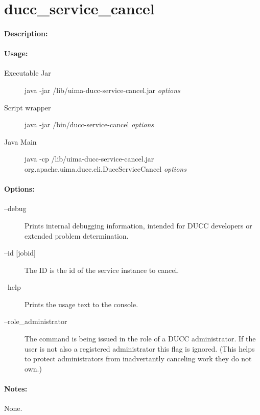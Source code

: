 \ifpdf
\else
{}
\fi
    \section{ducc\_service\_cancel}

    \paragraph{Description:}

    \paragraph{Usage:}
    \begin{description}
    \item[Executable Jar] java -jar \ducchome/lib/uima-ducc-service-cancel.jar {\em options}
    \item[Script wrapper] java -jar \ducchome/bin/ducc-service-cancel {\em options}
    \item[Java Main]      java -cp \ducchome/lib/uima-ducc-service-cancel.jar org.apache.uima.ducc.cli.DuccServiceCancel {\em options}
    \end{description}

    \paragraph{Options:}
    \begin{description}
        \item[--debug ]          
          Prints internal debugging information, intended for DUCC developers or extended problem determination.          
        \item[--id {[jobid]}]
          The ID is the id of the service instance to cancel.
        \item[--help]
          Prints the usage text to the console. 
        \item[--role\_administrator] The command is being issued in the role of a DUCC administrator.
          If the user is not also a registered administrator this flag is ignored.  (This helps to
          protect administrators from inadvertantly canceling work they do not own.)
     \end{description}
        
    \paragraph{Notes:}
    None.

